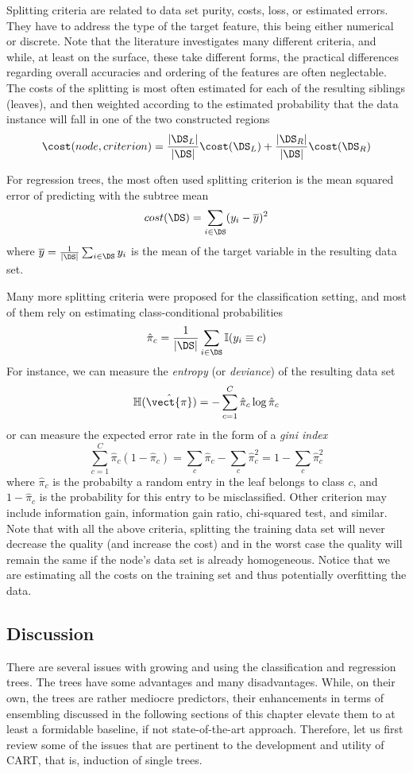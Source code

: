 \begin{refsection}
Splitting criteria are related to data set purity, costs, loss, or estimated errors. They have to address the type of the target feature, this being either numerical or discrete. Note that the literature investigates many different criteria, and while, at least on the surface, these take different forms, the practical differences regarding overall accuracies and ordering of the features are often neglectable. The costs of the splitting is most often estimated for each of the resulting siblings (leaves), and then weighted according to the estimated probability that the data instance will fall in one of the two constructed regions
$$ \cost(node, criterion) = {|\DS_L|\over |\DS|}\cost(\DS_L) + {|\DS_R|\over |\DS|}\cost(\DS_R) $$

For regression trees, the most often used splitting criterion is the mean squared error of predicting with the subtree mean
$$ cost(\DS) = \sum_{i\in\DS}(y_i-\overline{y})^2 $$
where $\overline{y} = {1\over|\DS|}\sum_{i\in\DS}y_i$ is the mean of the target variable in the resulting data set.

Many more splitting criteria were proposed for the classification setting, and most of them rely on estimating class-conditional probabilities
$$ \hat{\pi}_c = {1\over|\DS|}\sum_{i\in\DS}\mathbb{I}(y_i\equiv c) $$
For instance, we can measure the {\em entropy} (or {\em deviance}) of the resulting data set
$$ \mathbb{H}(\hat{\vect{\pi}}) = -\sum_{c=1}^C \hat{\pi}_c \log \hat{\pi}_c $$
or can measure the expected error rate in the form of a {\em gini index}
$$ \sum_{c=1}^C \hat{\pi}_c (1-\hat{\pi}_c) = \sum_c \hat{\pi}_c - \sum_c \hat{\pi}_c^2 = 1 - \sum_c \hat{\pi}_c^2 $$
where $\hat{\pi}_c$ is the probabilty a random entry in the leaf belongs to class $c$, and $1-\hat{\pi}_c$ is the probability for this entry to be misclassified. Other criterion may include information gain, information gain ratio, chi-squared test, and similar. Note that with all the above criteria, splitting the training data set will never decrease the quality (and increase the cost) and in the worst case the quality will remain the same if the node's data set is already homogeneous. Notice that we are estimating all the costs on the training set and thus potentially overfitting the data.

\subsection*{Discussion}

There are several issues with growing and using the classification and regression trees. The trees have some advantages and many disadvantages. While, on their own, the trees are rather mediocre predictors, their enhancements in terms of ensembling discussed in the following sections of this chapter elevate them to at least a formidable baseline, if not state-of-the-art approach. Therefore, let us first review some of the issues that are pertinent to the development and utility of CART, that is, induction of single trees.


\end{refsection}
